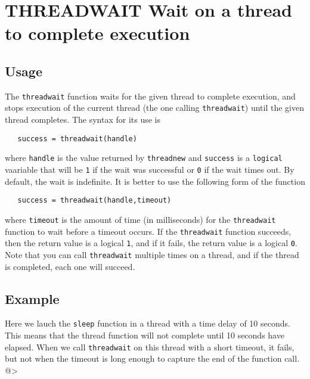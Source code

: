 \section{THREADWAIT Wait on a thread to complete execution}

\subsection{Usage}

The \verb|threadwait| function waits for the given thread to complete
execution, and stops execution of the current thread (the one calling
\verb|threadwait|) until the given thread completes.  The syntax for its
use is 
\begin{verbatim}
   success = threadwait(handle)
\end{verbatim}
where \verb|handle| is the value returned by \verb|threadnew| and \verb|success|
is a \verb|logical| vaariable that will be \verb|1| if the wait was successful
or \verb|0| if the wait times out.  By default, the wait is indefinite.  It
is better to use the following form of the function
\begin{verbatim}
   success = threadwait(handle,timeout)
\end{verbatim}
where \verb|timeout| is the amount of time (in milliseconds) for 
the \verb|threadwait| function to wait before a timeout occurs.  
If the \verb|threadwait| function succeeds, then the return 
value is a logical \verb|1|, and if it fails, the return value 
is a logical \verb|0|.  Note that you can call \verb|threadwait| multiple
times on a thread, and if the thread is completed, each one
will succeed.
\subsection{Example}

Here we lauch the \verb|sleep| function in a thread with a time delay of 
10 seconds.  This means that the thread function will not complete
until 10 seconds have elapsed.  When we call \verb|threadwait| on this
thread with a short timeout, it fails, but not when the timeout
is long enough to capture the end of the function call.
@>
